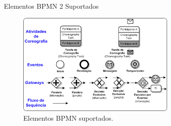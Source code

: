 \documentclass[xcolor=svgnames]{beamer}
\begin{document}
  \begin{frame}{Elementos BPMN 2 Suportados }
      \begin{figure}[!h]
	\centering
	\includegraphics[width=0.7\textwidth]{./figures/BPMNBasicChoroegraphy.png}
	\caption{Elementos BPMN suportados.}
	\label{fig:ChoreographyElements}
    \end{figure}

  \end{frame}
\end{document}
